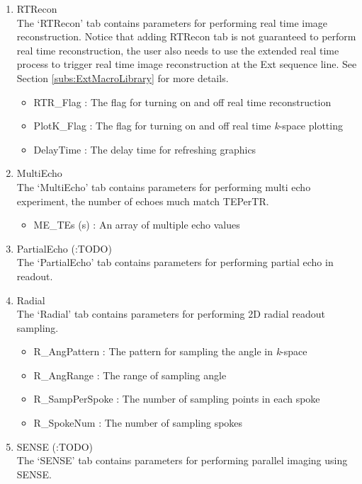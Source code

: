 \documentclass{book}%
\begin{document}
\begin{enumerate}
	\item RTRecon \\
	The `RTRecon' tab contains parameters for performing real time image reconstruction. Notice that adding RTRecon tab is not guaranteed to perform real time reconstruction, the user also needs to use the extended real time process to trigger real time image reconstruction at the Ext sequence line. See Section \ref{subs:ExtMacroLibrary} for more details.
	\begin{itemize}
		\item RTR\_Flag : The flag for turning on and off real time reconstruction
		\item PlotK\_Flag : The flag for turning on and off real time \textit{k}-space plotting
		\item DelayTime : The delay time for refreshing graphics
	\end{itemize}
		
  \item MultiEcho \\
	The `MultiEcho' tab contains parameters for performing multi echo experiment, the number of echoes much match TEPerTR.
		\begin{itemize}
			\item ME\_TEs (s) : An array of multiple echo values
		\end{itemize}
	
	\item PartialEcho (:TODO) \\
	The `PartialEcho' tab contains parameters for performing partial echo in readout.
	
	\item Radial \\
	The `Radial' tab contains parameters for performing 2D radial readout sampling.
		\begin{itemize}
			\item R\_AngPattern : The pattern for sampling the angle in \textit{k}-space
			\item R\_AngRange : The range of sampling angle
			\item R\_SampPerSpoke : The number of sampling points in each spoke
			\item R\_SpokeNum : The number of sampling spokes
		\end{itemize}
	
  \item SENSE (:TODO) \\
	The `SENSE' tab contains parameters for performing parallel imaging using SENSE.
	

\end{enumerate}
\end{document}
